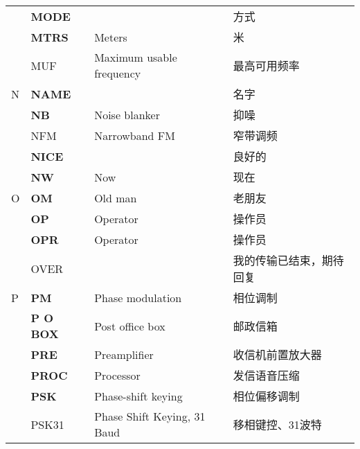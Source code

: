 \begin{longtable}[l]{llll}
    & \textbf{MODE}                     &                                         & 方式                  \\
    & \textbf{MTRS}                     & Meters                                  & 米                   \\
    & MUF                               & Maximum usable frequency                & 最高可用频率              \\
  N & \textbf{NAME}                     &                                         & 名字                  \\
    & \textbf{NB}                       & Noise blanker                           & 抑噪                  \\
    & NFM                               & Narrowband FM                           & 窄带调频                \\
    & \textbf{NICE}                     &                                         & 良好的                 \\
    & \textbf{NW}                       & Now                                     & 现在                  \\
  O & \textbf{OM}                       & Old man                                 & 老朋友                 \\%
    & \textbf{OP}                       & Operator                                & 操作员                 \\
    & \textbf{OPR}                      & Operator                                & 操作员                 \\
    & OVER                              &                                         & 我的传输已结束，期待回复        \\
  P & \textbf{PM}                       & Phase modulation                        & 相位调制                \\
    & \textbf{P O BOX}                  & Post office box                         & 邮政信箱                \\
    & \textbf{PRE}                      & Preamplifier                            & 收信机前置放大器            \\
    & \textbf{PROC}                     & Processor                               & 发信语音压缩              \\
    & \textbf{PSK}                      & Phase-shift keying                      & 相位偏移调制              \\
    & PSK31                             & Phase Shift Keying, 31 Baud             & 移相键控、31波特           \\

\end{longtable}
